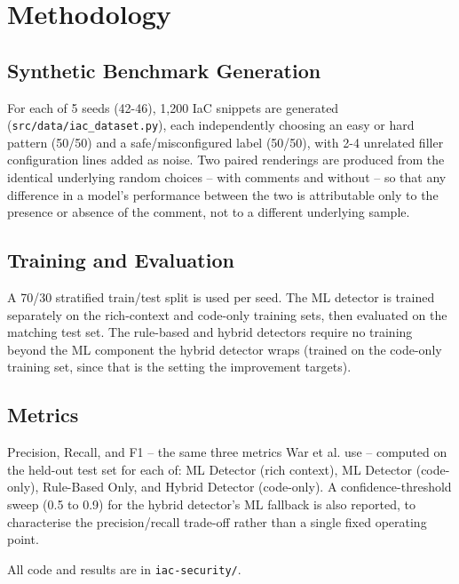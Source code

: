 
\section{Methodology}
\label{sec:Methodology}

\subsection{Synthetic Benchmark Generation}
For each of 5 seeds (42-46), 1,200 IaC snippets are generated (\texttt{src/data/iac\_dataset.py}), each independently choosing an easy or hard pattern (50/50) and a safe/misconfigured label (50/50), with 2-4 unrelated filler configuration lines added as noise. Two paired renderings are produced from the identical underlying random choices -- with comments and without -- so that any difference in a model's performance between the two is attributable only to the presence or absence of the comment, not to a different underlying sample.

\subsection{Training and Evaluation}
A 70/30 stratified train/test split is used per seed. The ML detector is trained separately on the rich-context and code-only training sets, then evaluated on the matching test set. The rule-based and hybrid detectors require no training beyond the ML component the hybrid detector wraps (trained on the code-only training set, since that is the setting the improvement targets).

\subsection{Metrics}
Precision, Recall, and F1 -- the same three metrics War et al. use -- computed on the held-out test set for each of: ML Detector (rich context), ML Detector (code-only), Rule-Based Only, and Hybrid Detector (code-only). A confidence-threshold sweep (0.5 to 0.9) for the hybrid detector's ML fallback is also reported, to characterise the precision/recall trade-off rather than a single fixed operating point.

All code and results are in \texttt{iac-security/}.
